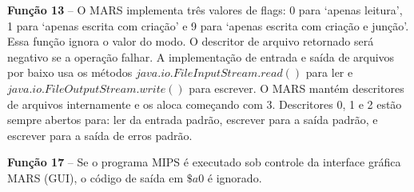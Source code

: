 \textbf{Função 13} -- O MARS implementa três valores de flags: 0 para `apenas leitura', 1 para `apenas escrita com criação' e 9 para `apenas escrita com criação e junção'. Essa função ignora o valor do modo. O descritor de arquivo retornado será negativo se a operação falhar. A implementação de entrada e saída de arquivos por baixo usa os métodos $java.io.FileInputStream.read()$ para ler e $java.io.FileOutputStream.write()$ para escrever. O MARS mantém descritores de arquivos internamente e os aloca começando com 3. Descritores 0, 1 e 2 estão sempre abertos para: ler da entrada padrão, escrever para a saída padrão, e escrever para a saída de erros padrão.

\textbf{Função 17} -- Se o programa MIPS é executado sob controle da interface gráfica MARS (GUI), o código de saída em $\$a0$ é ignorado.
